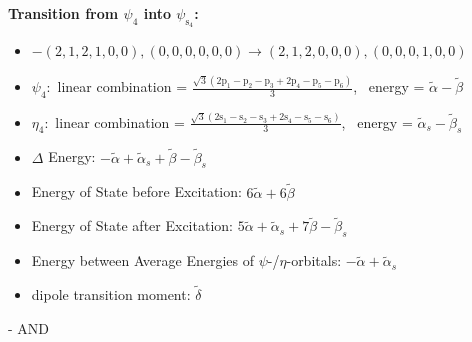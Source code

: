 \documentclass[12pt,a4paper]{article}
\begin{document}
        \noindent\textbf{Transition from $\psi_{4}$ into $\psi_{\text{s}_{4}}$:}
        \begin{itemize}
            \item $- (2, 1, 2, 1, 0, 0), (0, 0, 0, 0, 0, 0) \rightarrow (2, 1, 2, 0, 0, 0), (0, 0, 0, 1, 0, 0)$
        
            \item $\psi_{4}:$ linear combination = $\frac{\sqrt{3} \left(2 \text{p}_{1} - \text{p}_{2} - \text{p}_{3} + 2 \text{p}_{4} - \text{p}_{5} - \text{p}_{6}\right)}{3}$, \
            energy = $\tilde{\alpha} - \tilde{\beta}$
            
            \item $\eta_{4}:$ linear combination = $\frac{\sqrt{3} \left(2 \text{s}_{1} - \text{s}_{2} - \text{s}_{3} + 2 \text{s}_{4} - \text{s}_{5} - \text{s}_{6}\right)}{3}$, \
            energy = $\tilde{\alpha}_{s} - \tilde{\beta}_{s}$
            
                \item $\Delta$ Energy: $- \tilde{\alpha} + \tilde{\alpha}_{s} + \tilde{\beta} - \tilde{\beta}_{s}$
                \item Energy of State before Excitation: $6 \tilde{\alpha} + 6 \tilde{\beta}$
                \item Energy of State after Excitation: $5 \tilde{\alpha} + \tilde{\alpha}_{s} + 7 \tilde{\beta} - \tilde{\beta}_{s}$
                \item Energy between Average Energies of $\psi$-/$\eta$-orbitals: $- \tilde{\alpha} + \tilde{\alpha}_{s}$
            
            \item dipole transition moment: $\tilde{\delta}$
        
        \end{itemize}
        
 -  AND 
\end{document}
